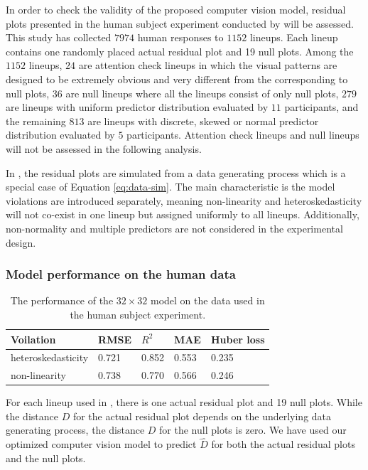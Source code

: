\documentclass[]{interact}
\theoremstyle{plain}%
\theoremstyle{definition}
\theoremstyle{remark}
\begin{document}
In order to check the validity of the proposed computer vision model,
residual plots presented in the human subject experiment conducted by
\citet{li2023plot} will be assessed. This study has collected \(7974\)
human responses to \(1152\) lineups. Each lineup contains one randomly
placed actual residual plot and 19 null plots. Among the \(1152\)
lineups, \(24\) are attention check lineups in which the visual patterns
are designed to be extremely obvious and very different from the
corresponding to null plots, \(36\) are null lineups where all the
lineups consist of only null plots, \(279\) are lineups with uniform
predictor distribution evaluated by \(11\) participants, and the
remaining \(813\) are lineups with discrete, skewed or normal predictor
distribution evaluated by \(5\) participants. Attention check lineups
and null lineups will not be assessed in the following analysis.

In \citet{li2023plot}, the residual plots are simulated from a data
generating process which is a special case of Equation
\ref{eq:data-sim}. The main characteristic is the model violations are
introduced separately, meaning non-linearity and heteroskedasticity will
not co-exist in one lineup but assigned uniformly to all lineups.
Additionally, non-normality and multiple predictors are not considered
in the experimental design.

\hypertarget{model-performance-on-the-human-data}{%
\subsubsection{Model performance on the human
data}\label{model-performance-on-the-human-data}}

\begin{table}

\caption{\label{tab:experiment-performance}The performance of the $32 \times 32$ model on the data used in the human subject experiment.}
\centering
\begin{tabular}[t]{lllll}
\toprule
Voilation & RMSE & $R^2$ & MAE & Huber loss\\
\midrule
heteroskedasticity & 0.721 & 0.852 & 0.553 & 0.235\\
non-linearity & 0.738 & 0.770 & 0.566 & 0.246\\
\bottomrule
\end{tabular}
\end{table}

For each lineup used in \citet{li2023plot}, there is one actual residual
plot and 19 null plots. While the distance \(D\) for the actual residual
plot depends on the underlying data generating process, the distance
\(D\) for the null plots is zero. We have used our optimized computer
vision model to predict \(\hat{D}\) for both the actual residual plots
and the null plots.
\end{document}
